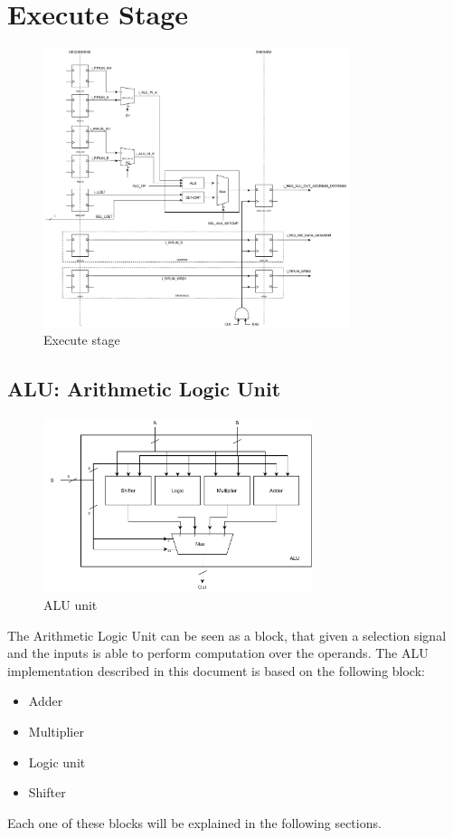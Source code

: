 \chapter{Execute Stage}

\begin{figure}[ht]
	\centering
	\includegraphics[width=0.8\textwidth]{chapters/5_ExecuteStage/images/exe_stage.pdf}
	\caption{Execute stage}
	\label{fig:execute-stage}
\end{figure}

\section{ALU: Arithmetic Logic Unit}
\begin{figure}[h]
	\centering
	\includegraphics[width=0.7\textwidth]{chapters/5_ExecuteStage/images/ALU.pdf}
	\caption{ALU unit}
	\label{fig:ALU}
\end{figure}
The Arithmetic Logic Unit can be seen as a block, that given a selection signal and the inputs is able to perform computation over the operands. The ALU implementation described in this document is based on the following block:
\begin{itemize}
	\itemsep0sp
	\item Adder
	\item Multiplier
	\item Logic unit
	\item Shifter
\end{itemize}
Each one of these blocks will be explained in the following sections.


